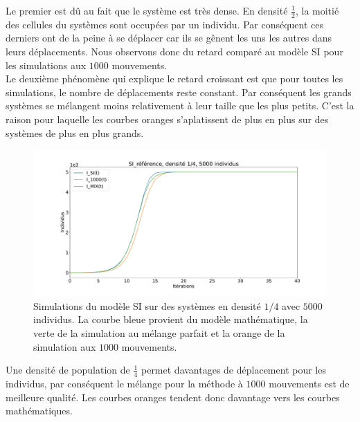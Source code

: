 Le premier est dû au fait que le système est très dense. En densité $\frac{1}{2}$, la moitié des cellules du systèmes sont occupées par un individu. Par conséquent ces derniers ont de la peine à se déplacer car ils se gênent les uns les autres dans leurs déplacements. Nous observons donc du retard comparé au modèle SI pour les simulations aux $1000$ mouvements. \\

Le deuxième phénomène qui explique le retard croissant est que pour toutes les simulations, le nombre de déplacements reste constant. Par conséquent les grands systèmes se mélangent moins relativement à leur taille que les plus petits. C'est la raison pour laquelle les courbes oranges s'aplatissent de plus en plus sur des systèmes de plus en plus grands.\\

\newpage

\begin{figure}[h]
	\centering
	\captionsetup{justification=centering}
	\includegraphics[width=1\textwidth]{Images/SI_ref_4_5k.pdf}
	\caption[Simulations de SI, densité 1/4]{Simulations du modèle SI sur des systèmes en densité $1/4$ avec $5000$ individus. La courbe bleue provient du modèle mathématique, la verte de la simulation au mélange parfait et la orange de la simulation aux $1000$ mouvements.}
\end{figure}

Une densité de population de $\frac{1}{4}$ permet davantages de déplacement pour les individus, par conséquent le mélange pour la méthode à $1000$ mouvements est de meilleure qualité. Les courbes oranges tendent donc davantage vers les courbes mathématiques.

